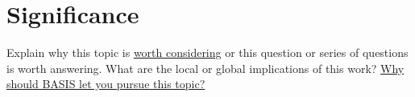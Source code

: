 
\section[Significance]{Significance}

Explain why this topic is \underline{worth considering} or this question or series of questions is worth answering. What are the local or global implications of this work? \underline{Why should BASIS let you pursue this topic?}